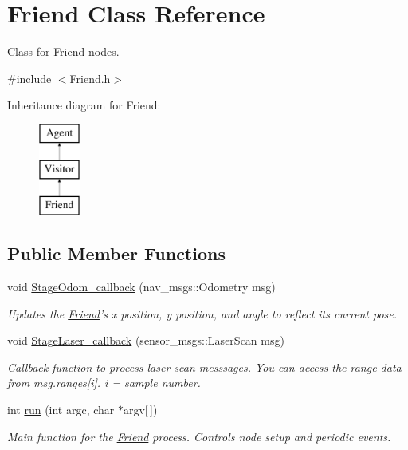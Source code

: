 \hypertarget{classFriend}{\section{Friend Class Reference}
\label{classFriend}
}


Class for \hyperlink{classFriend}{Friend} nodes.  




{\ttfamily \#include $<$Friend.\-h$>$}

Inheritance diagram for Friend\-:\begin{figure}[H]
\begin{center}
\leavevmode
\includegraphics[height=3.000000cm]{classFriend}
\end{center}
\end{figure}
\subsection*{Public Member Functions}
\begin{DoxyCompactItemize}
\item 
void \hyperlink{classFriend_ab336b2a40bc6b9787bd0e9283f29f468}{Stage\-Odom\-\_\-callback} (nav\-\_\-msgs\-::\-Odometry msg)
\begin{DoxyCompactList}\small\item\em Updates the \hyperlink{classFriend}{Friend}'s x position, y position, and angle to reflect its current pose. \end{DoxyCompactList}\item 
void \hyperlink{classFriend_a1334996a432a7d435d40169bad684dc4}{Stage\-Laser\-\_\-callback} (sensor\-\_\-msgs\-::\-Laser\-Scan msg)
\begin{DoxyCompactList}\small\item\em Callback function to process laser scan messsages. You can access the range data from msg.\-ranges\mbox{[}i\mbox{]}. i = sample number. \end{DoxyCompactList}\item 
\hypertarget{classFriend_a0a4bf249b808ade72706f8f0a639ccde}{int \hyperlink{classFriend_a0a4bf249b808ade72706f8f0a639ccde}{run} (int argc, char $\ast$argv\mbox{[}$\,$\mbox{]})}\label{classFriend_a0a4bf249b808ade72706f8f0a639ccde}

\begin{DoxyCompactList}\small\item\em Main function for the \hyperlink{classFriend}{Friend} process. Controls node setup and periodic events. \end{DoxyCompactList}\end{DoxyCompactItemize}
